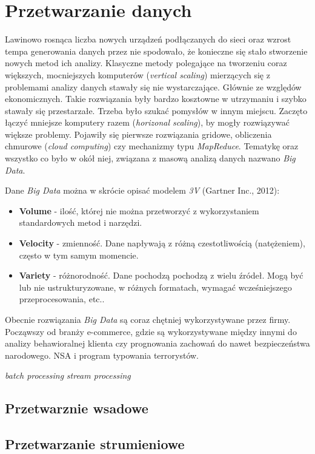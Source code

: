 \section{Przetwarzanie danych}

Lawinowo rosnąca liczba nowych urządzeń podłączanych do sieci
oraz wzrost tempa generowania danych przez nie spodowało,
że konieczne się stało stworzenie nowych metod ich analizy.
Klasyczne metody polegające na tworzeniu coraz większych,
mocniejszych komputerów (\textit{vertical scaling})
mierzących się z problemami analizy danych stawały się nie wystarczające.
Głównie ze względów ekonomicznych.
Takie rozwiązania były bardzo kosztowne w utrzymaniu i szybko stawały się przestarzałe.
Trzeba było szukać pomysłów w innym miejscu.
Zaczęto łączyć mniejsze komputery razem (\textit{horizonal scaling}),
by mogły rozwiązywać większe problemy.
Pojawiły się pierwsze rozwiązania gridowe,
obliczenia chmurowe (\textit{cloud computing})
czy mechanizmy typu \textit{MapReduce}.
Tematykę oraz wszystko co było w okół niej,
związana z masową analizą danych nazwano \textit{Big Data}.

Dane \textit{Big Data} można w skrócie opisać modelem \textit{3V} (Gartner Inc., 2012):
\begin{itemize}
		\item \textbf{Volume} - ilość,
		której nie można przetworzyć z wykorzystaniem standardowych metod i narzędzi.
		\item \textbf{Velocity} - zmienność.
		Dane napływają z różną czestotliwością (natężeniem),
		często w tym samym momencie.
		\item \textbf{Variety} - różnorodność.
		Dane pochodzą pochodzą z wielu źródeł.
		Mogą być lub nie ustrukturyzowane,
		w różnych formatach,
		wymagać wcześniejszego przeprocesowania,
		etc..
\end{itemize}

Obecnie rozwiązania \textit{Big Data} są coraz chętniej wykorzystywane przez firmy.
Począwszy od branży e-commerce,
gdzie są wykorzystywane między innymi do analizy behawioralnej klienta czy prognowania zachowań
do nawet bezpieczeństwa narodowego. NSA i program typowania terrorystów.

\textit{batch processing}
\textit{stream processing}

\subsection{Przetwarznie wsadowe}
\subsection{Przetwarzanie strumieniowe}




